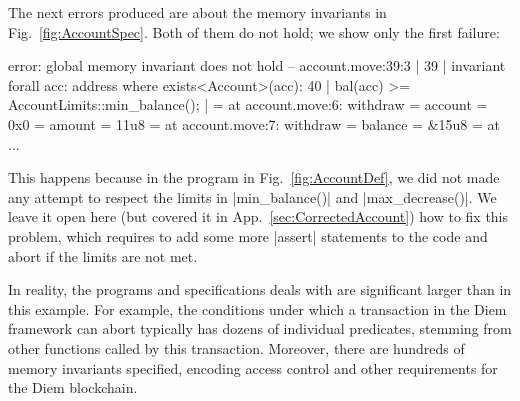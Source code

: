 The next errors produced are about the memory invariants in
Fig.~\ref{fig:AccountSpec}. Both of them do not hold; we show only the first failure:

\begin{MoveDiag}
error: global memory invariant does not hold
   -- account.move:39:3
   |
39 |    invariant forall acc: address where exists<Account>(acc):
40 |      bal(acc) >= AccountLimits::min_balance();
   |
   =     at account.move:6: withdraw
   =         account = 0x0
   =         amount = 11u8
   =     at account.move:7: withdraw
   =         balance = &15u8
   =     at ...
\end{MoveDiag}

\noindent This happens because in the program in Fig.~\ref{fig:AccountDef}, we
did not made any attempt to respect the limits in |min_balance()| and
|max_decrease()|. We leave it open here (but covered it in
App.~\ref{sec:CorrectedAccount}) how to fix this problem, which requires
to add some more |assert| statements to the code and abort if the limits are not
met.

In reality, the programs and specifications \MVP deals with are significant larger than
in this example. For example, the conditions under which a transaction
in the Diem framework can abort typically has dozens of individual predicates,
stemming from other functions called by this transaction. Moreover, there are
hundreds of memory invariants specified, encoding access control and other
requirements for the Diem blockchain.

